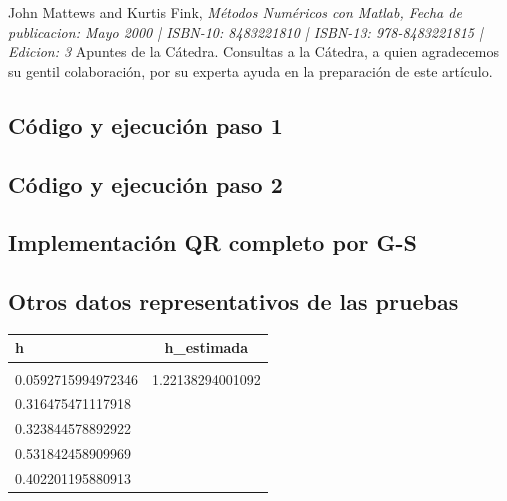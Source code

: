 \documentclass[10pt,journal,compsoc]{IEEEtran}
\begin{document}
\renewcommand{\refname}{Bibliograf\'ia}
\begin{thebibliography}{1}
John Mattews and Kurtis Fink, \emph{M\'etodos Num\'ericos con Matlab, Fecha de publicacion: Mayo 2000 | ISBN-10: 8483221810 | ISBN-13: 978-8483221815 | Edicion: 3}
 Apuntes de la C\'atedra.
 Consultas a la C\'atedra, a quien agradecemos su gentil colaboraci\'on, por su experta ayuda  en la preparaci\'on de este art\'iculo.

\end{thebibliography}


\newpage

\onecolumn

\renewcommand\appendixname{Ap\'endice}

\appendix
\subsection{C\'odigo y ejecuci\'on paso 1}
 
\subsection{C\'odigo y ejecuci\'on paso 2}
 
\subsection{Implementaci\'on QR completo por G-S}
 
 \newpage
\subsection{Otros datos representativos de las pruebas}
 
\begin{tabular}{l c}
\hline\hline
h & h\_estimada\\
\hline \\
0.0592715994972346 & 1.22138294001092\\
0.316475471117918 &\\
0.323844578892922 &\\
0.531842458909969 &\\
0.402201195880913 &\\

\hline\hline

\end{tabular}
 
\end{document}
